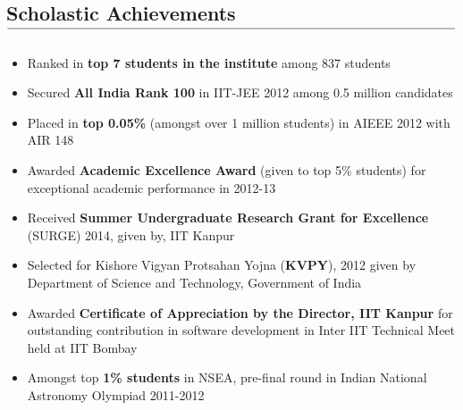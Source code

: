 \documentclass[10pt,letterpaper]{article}
\newcommand\tline[2]{$\underset{\text{#1}}{\text{\underline{\hspace{#2}}}}$}
\begin{document}
\subsection*{Scholastic Achievements\tline{}{5.2in}}
\vspace{-0.7em}
\begin{itemize}
	\parskip=0.1em

	\item Ranked in \textbf{top 7 students in the institute} among 837 students

	\item Secured \textbf{All India Rank 100} in IIT-JEE 2012 among 0.5 million candidates

	\item Placed in \textbf{top 0.05\%} (amongst over 1 million students) in AIEEE 2012 with AIR 148

	\item Awarded \textbf{Academic Excellence Award} (given to top 5\% students) for exceptional academic performance in
2012-13

	\item Received \textbf{Summer Undergraduate Research Grant for Excellence} (SURGE) 2014, given by, IIT Kanpur

	\item Selected for Kishore Vigyan Protsahan Yojna (\textbf{KVPY}), 2012 given by Department of Science and Technology,
Government of India

	\item Awarded \textbf{Certificate of Appreciation by the Director, IIT Kanpur} for outstanding contribution in software
development in Inter IIT Technical Meet held at IIT Bombay

	\item Amongst top \textbf{1\% students} in NSEA, pre-final round in Indian National Astronomy Olympiad 2011-2012

	

\end{itemize}




\vspace{-1.8em}
\end{document}
